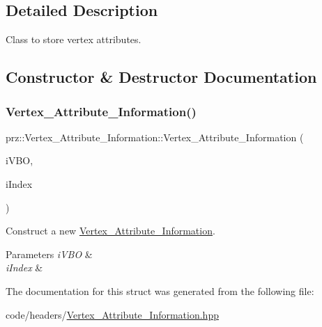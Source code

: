\subsection{Detailed Description}
Class to store vertex attributes. 



\subsection{Constructor \& Destructor Documentation}
\mbox{\label{structprz_1_1_vertex___attribute___information_a614c871d3a18142a85caeba7e6223f49}} 
\subsubsection{\texorpdfstring{Vertex\_Attribute\_Information()}{Vertex\_Attribute\_Information()}}
{\footnotesize\ttfamily prz\+::\+Vertex\+\_\+\+Attribute\+\_\+\+Information\+::\+Vertex\+\_\+\+Attribute\+\_\+\+Information (\begin{DoxyParamCaption}\item[{P\+S\+Ptr$<$ \mbox{\hyperlink{classprz_1_1_vertex___buffer___object}{P\+V\+BO}} $>$}]{i\+V\+BO,  }\item[{G\+Luint}]{i\+Index }\end{DoxyParamCaption})\hspace{0.3cm}{\ttfamily [inline]}}



Construct a new \mbox{\hyperlink{structprz_1_1_vertex___attribute___information}{Vertex\+\_\+\+Attribute\+\_\+\+Information}}. 


\begin{DoxyParams}{Parameters}
{\em i\+V\+BO} & \\
\hline
{\em i\+Index} & \\
\hline
\end{DoxyParams}


The documentation for this struct was generated from the following file\+:\begin{DoxyCompactItemize}
\item 
code/headers/\mbox{\hyperlink{_vertex___attribute___information_8hpp}{Vertex\+\_\+\+Attribute\+\_\+\+Information.\+hpp}}\end{DoxyCompactItemize}
